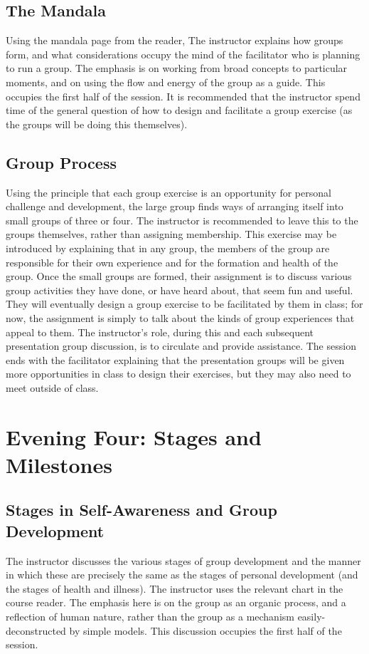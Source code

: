 \documentclass[12pt,DIV7,oneside,tocindent,headsepline]{scrbook}
\begin{document}
\subsection{The Mandala}  Using the mandala page from the reader, The instructor explains how groups form, and what considerations occupy the mind of the facilitator who is planning to run a group. The emphasis is on working from broad concepts to particular moments, and on using the flow and energy of the group as a guide. This occupies the first half of the session.  It is recommended that the instructor spend time of the general question of how to design and facilitate a group exercise (as the groups will be doing this themselves).  \subsection{Group Process}  Using the principle that each group exercise is an opportunity for personal challenge and development, the large group finds ways of arranging itself into small groups of three or four. The instructor is recommended to leave this to the groups themselves, rather than assigning membership. This exercise may be introduced by explaining that in any group, the members of the group are responsible for their own experience and for the formation and health of the group.  Once the small groups are formed, their assignment is to discuss various group activities they have done, or have heard about, that seem fun and useful. They will eventually design a group exercise to be facilitated by them in class; for now, the assignment is simply to talk about the kinds of group experiences that appeal to them.  The instructor's role, during this and each subsequent presentation group discussion, is to circulate and provide assistance.  The session ends with the facilitator explaining that the presentation groups will be given more opportunities in class to design their exercises, but they may also need to meet outside of class.

\section{Evening Four: Stages and Milestones} 

\subsection{Stages in Self-Awareness and Group Development}  The instructor discusses the various stages of group development and the manner in which these are precisely the same as the stages of personal development (and the stages of health and illness). The instructor uses the relevant chart in the course reader. The emphasis here is on the group as an organic process, and a reflection of human nature, rather than the group as a mechanism easily-deconstructed by simple models. This discussion occupies the first half of the session. 
\end{document}
